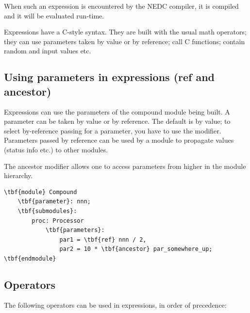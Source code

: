 When such an expression is encountered by the NEDC compiler, it is
compiled and it will be evaluated
run-time.

Expressions have a C-style syntax. They are built with the usual math
operators; they can use parameters taken by
value or by reference; call C functions; contain random and input
values etc.





\subsection{Using parameters in expressions (ref and ancestor)}

Expressions can use the parameters of the compound module being built.
A parameter can be taken by value or by
reference. The default is by value;
to select by-reference passing for a parameter, you have to use the
 modifier. Parameters passed by
reference can be used by a module to propagate values (status info
etc.)  to other modules.

The ancestor modifier allows one to access parameters from higher 
in the module hierarchy.


\begin{Verbatim}[commandchars=\\\{\}]
\tbf{module} Compound
    \tbf{parameter}: nnn;
    \tbf{submodules}:
        proc: Processor
            \tbf{parameters}:
                par1 = \tbf{ref} nnn / 2,
                par2 = 10 * \tbf{ancestor} par_somewhere_up;
\tbf{endmodule}
\end{Verbatim}





\subsection{Operators}

The following operators can be used
in expressions, in order of precedence:


